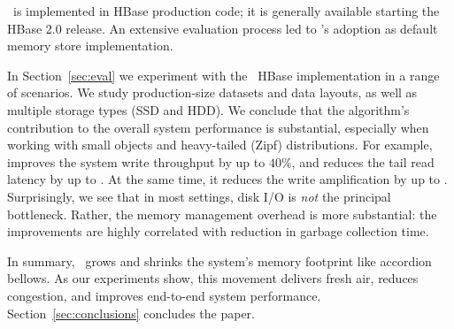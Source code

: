 
\sys\ is implemented in HBase production code; it is generally available starting the HBase 2.0 release. 
An extensive evaluation process led to \sys's adoption as default memory store implementation. 

In Section~\ref{sec:eval} we experiment with the \sys\ HBase implementation in a range of scenarios.
We study production-size datasets and data layouts, as well as multiple storage types (SSD and HDD). 
We conclude that the algorithm's contribution to the overall system performance is substantial, 
especially when working with small objects and heavy-tailed (Zipf) distributions. For example, \sys\/ 
improves the system write throughput by up to $40\%$, and reduces the tail read latency by up to 
. At the same time, it reduces the write amplification by up to . Surprisingly, we see 
that in most settings, disk I/O is \emph{not} the principal bottleneck. Rather, the memory management 
overhead is more substantial: the improvements are highly correlated with  reduction in garbage collection time. 

In summary, \sys\ grows and shrinks the system's memory footprint like accordion bellows. 
As our experiments show, this movement delivers fresh air, reduces congestion, 
and improves end-to-end system performance. 
Section~\ref{sec:conclusions} concludes the paper.


